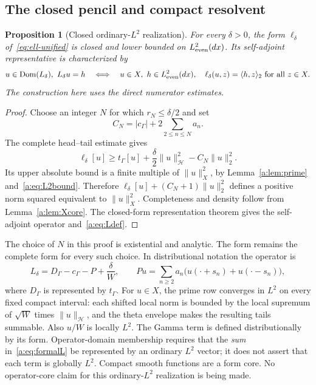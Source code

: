 \documentclass[11pt,a4paper]{article}
\numberwithin{equation}{section}
\newtheorem{proposition}[theorem]{Proposition}
\theoremstyle{definition}\newtheorem{definition}[theorem]{Definition}
\theoremstyle{remark}\newtheorem{remark}[theorem]{Remark}
\newcommand{\Hh}{\mathcal H}\newcommand{\Hw}{\mathcal H}
\newcommand{\tg}{t_\Gamma}\newcommand{\cg}{c_\Gamma}
\newcommand{\dom}{\operatorname{Dom}}\newcommand{\Var}{\operatorname{Var}}
\newcommand{\ip}[2]{\langle#1,#2\rangle}\newcommand{\norm}[1]{\lVert#1\rVert}\newcommand{\abs}[1]{\lvert#1\rvert}
\begin{document}
\subsection{The closed pencil and compact resolvent}\label{a:sec:pencil}

\begin{proposition}[Closed ordinary-$L^2$ realization]\label{a:prop:closedpencil}
For every $\delta>0$, the form $\ell_\delta$ of~\eqref{eq:ell-unified} is closed and lower bounded on $L^2_{\mathrm{even}}(dx)$. Its self-adjoint representative is characterized by
\begin{equation}\label{a:eq:Ldef}
 \begin{split}
 u\in\dom(L_\delta),\ L_\delta u=h\quad\Longleftrightarrow\quad
 u\in X,\ h\in\Le,\quad
 \ell_\delta(u,z)=\ip{h}{z}_2\ \text{for all }z\in X.
 \end{split}
\end{equation}
The construction here uses the direct numerator estimates.
\end{proposition}
\begin{proof}
Choose an integer $N$ for which $r_N\le\delta/2$ and set
\[
 C_N=|\cg|+2\sum_{2\le n\le N}a_n.
\]
The complete head--tail estimate gives
\begin{equation}\label{a:eq:coercive}
 \ell_\delta[u]\ge\tg[u]+\frac\delta2\norm{u}_{\Hh}^2-C_N\norm{u}_2^2.
\end{equation}
Its upper absolute bound is a finite multiple of $\norm{u}_X^2$, by Lemma~\ref{a:lem:prime} and~\eqref{a:eq:L2bound}. Therefore
$\ell_\delta[u]+(C_N+1)\norm{u}_2^2$ defines a positive norm squared equivalent to $\norm{u}_X^2$. Completeness and density follow from Lemma~\ref{a:lem:Xcore}. The closed-form representation theorem gives the self-adjoint operator and~\eqref{a:eq:Ldef}.
\end{proof}

The choice of $N$ in this proof is existential and analytic. The form remains the complete form for every such choice. In distributional notation the operator is
\begin{equation}\label{a:eq:formalL}
 L_\delta=D_\Gamma-\cg-P+\frac\delta W,
 \qquad
 Pu=\sum_{n\ge2}a_n\bigl(u(\cdot+s_n)+u(\cdot-s_n)\bigr),
\end{equation}
where $D_\Gamma$ is represented by $\tg$. For $u\in X$, the prime row converges in $L^2$ on every fixed compact interval: each shifted local norm is bounded by the local supremum of $\sqrt W$ times $\norm{u}_{\Hh}$, and the theta envelope makes the resulting tails summable. Also $u/W$ is locally $L^2$. The Gamma term is defined distributionally by its form. Operator-domain membership requires that the \emph{sum} in~\eqref{a:eq:formalL} be represented by an ordinary $L^2$ vector; it does not assert that each term is globally $L^2$. Compact smooth functions are a form core. No operator-core claim for this ordinary-$L^2$ realization is being made.
\end{document}
